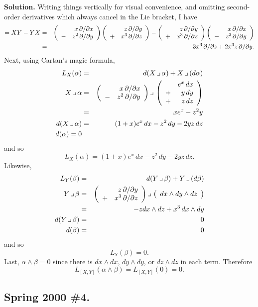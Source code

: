 \documentclass[10pt]{article}
\numberwithin{equation}{subsection}
\begin{document}
\textbf{Solution.}  Writing things vertically for visual convenience, and
omitting second-order derivatives which always cancel in the Lie bracket, I
have
\begin{eqnarray*}
	[X,Y] = XY - YX
%
	&=& \prmatrix{
		&x   \,\slashDx \\
		-&z^2\,\slashDy
	}
	\prmatrix{
		&z   \,\slashDy \\
		+&x^3\,\slashDz
	}
	-
	\prmatrix{
		&z   \,\slashDy \\
		+&x^3\,\slashDz
	}
	\prmatrix{
		&x   \,\slashDx \\
		-&z^2\,\slashDy
	} \\
%
	&=& 3x^3  \,\slashDz
	+   2x^3z \,\slashDy.
\end{eqnarray*}
Next, using Cartan's magic formula,
\begin{eqnarray*}
	L_X(\alpha) &=& d(X\,\lrcorner\,\alpha) + X\,\lrcorner\,(d\alpha) \\
	X\,\lrcorner\,\alpha &=&
		\left(\begin{array}{rrrrrrrrrrrr} 
			&  x   \,\partial/\partial x \\
			-& z^2 \,\partial/\partial y \\
		 \end{array}\right) \,\lrcorner\,
		\left(\begin{array}{rrrrrrrrrrrr} 
			&  e^x\,dx \\
			+& y  \,dy \\
			+& z  \,dz
		 \end{array}\right) \\
	&=& xe^x - z^2 y \\
	d(X\,\lrcorner\, \alpha) &=& (1+x)e^x\,dx - z^2 \,dy - 2yz\,dz \\
	d(\alpha) = 0
\end{eqnarray*}
and so
$$
	L_X(\alpha) = (1+x)e^x\,dx - z^2 \,dy - 2yz\,dz.
$$
Likewise,
\begin{eqnarray*}
	L_Y(\beta) &=& d(Y\,\lrcorner\,\beta) + Y\,\lrcorner\,(d\beta) \\
	Y\,\lrcorner\,\beta &=&
		\left(\begin{array}{rrrrrrrrrrrr} 
			&  z   \,\partial/\partial y \\
			+& x^3 \,\partial/\partial z \\
		 \end{array}\right) \,\lrcorner\,
		\left(\begin{array}{rrrrrrrrrrrr} 
			dx\wedge dy \wedge dz
		 \end{array}\right) \\
	&=& -z dx\wedge dz + x^3 \,dx \wedge dy \\
	d(Y\,\lrcorner\, \beta) &=& 0 \\
	d(\beta) &=& 0
\end{eqnarray*}
and so
$$
	L_Y(\beta) = 0.
$$
Last, $\alpha \wedge \beta = 0$ since there is $dx\wedge dx$,
$dy\wedge dy$, or $dz\wedge dz$ in each term.  Therefore
$$
	L_{[X,Y]}(\alpha\wedge \beta) =
	L_{[X,Y]}(0) = 0.
$$

\subsection{Spring 2000 \#4.}
\end{document}
